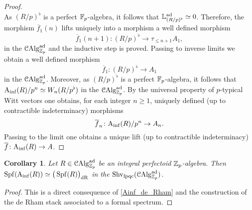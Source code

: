 \documentclass[10pt,a4paper]{amsart}
\numberwithin{equation}{subsection}
\newtheorem{corollary}[theorem]{Corollary}
\theoremstyle{definition}
\begin{document}
\begin{proof}
\[        \]
    As $(R/p)^\flat$ is a perfect $\mathbb F_p$-algebra, it follows that $\mathbb{L}^{\mathrm{ad}}_{(R/p)^\flat} \simeq 0 $. Therefore, the morphism $\overline{f}_1(n)$ lifts uniquely into a morphism a well defined morphism
        \[
                \overline{f}_1(n+1) \colon (R/p)^\flat \to \tau_{\leq n+1}A_1,  
        \]
    in the \infcat $\mathcal C \mathrm{Alg}^{\mathrm{ad}}_{\mathbb Z_p}$ and the inductive step is proved. Passing to inverse limits we obtain a well defined morphism
        \[
                \overline{f}_1 \colon (R/p)^\flat \to A_1
        \]
    in the \infcat $\mathcal C \mathrm{Alg}^{\mathrm{ad}}_{\mathbb Z_p}$.
    Moreover, as $(R/p)^\flat$ is a perfect $\mathbb F_p$-algebra, it follows that $\mathrm{A}_{\mathrm{inf}}(R)/p^n \simeq W_n(R/p^\flat)$ in the \infcat $\mathcal C \mathrm{Alg}^{\mathrm{ad}}_{\mathbb Z_p}$. By the universal property of $p$-typical Witt vectors one obtains, for each integer $n \geq 1$, uniquely defined (up to contractible indeterminacy) morphisms
        \[
            \overline{f}_n \colon \mathrm{A}_{\mathrm{inf}}(R)/p^n \to A_n.
        \]  
    Passing to the limit one obtains a unique lift (up to contractible indeterminacy) $\overline{f} \colon \mathrm{A}_{\mathrm{inf}}(R) \to A$. 
     

\end{proof}


\begin{corollary}
    Let $R \in \mathcal C \mathrm{Alg}^{\mathrm{ad}}_{\mathbb Z_p}$ be an integral perfectoid $\mathbb Z_p$-algebra. Then $\operatorname{Spf} (\mathrm{A}_{\mathrm{inf}}(R)) \simeq \big( \operatorname{Spf}(R) \big)_{\mathrm{dR}}$ in the \infcat $\mathrm{Shv}_{\mathrm{fpqc}}(\mathcal C \mathrm{Alg}^{\mathrm{ad}}_{\mathbb Z_p})$.
\end{corollary}

\begin{proof}
    This is a direct consequence of \cref{Ainf_de_Rham} and the construction of the de Rham stack associated to a formal spectrum. 
\end{proof}
\end{document}
